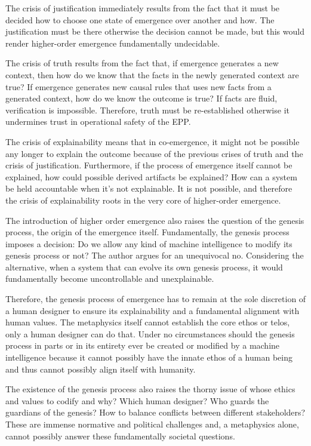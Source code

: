 The crisis of justification immediately results from the fact that it must be decided how to choose one state of emergence over another and how. The justification must be there otherwise the decision cannot be made, but this would render higher-order emergence fundamentally undecidable. 

The crisis of truth results from the fact that, if emergence generates a new context, then how do we know that
the facts in the newly generated context are true? If emergence generates new causal rules that uses new facts from a generated context, how do we know the outcome is true? If facts are fluid, verification is impossible. Therefore, truth must be re-established otherwise it undermines trust in operational safety of the EPP. 

The crisis of explainability means that in co-emergence, it might not be possible any longer to explain the outcome because of the previous crises of truth and the crisis of justification. Furthermore, if the process of emergence itself cannot be explained, how could possible derived artifacts be explained? How can a system be held accountable when it's not explainable. It is not possible, and therefore the crisis of explainability roots in the very core of higher-order emergence.

The introduction of higher order emergence also raises the question of the genesis process, 
the origin of the emergence itself. Fundamentally, the genesis process imposes a decision: Do we allow any kind of machine intelligence to modify its genesis process or not? The author argues for an unequivocal no. 
Considering the alternative, when a system that can evolve its own genesis process, it would fundamentally become uncontrollable and unexplainable. 

Therefore, the genesis process of emergence  has to remain at the sole discretion of a human designer to ensure its explainability and a fundamental alignment with human values. The metaphysics itself cannot establish the core ethos or telos, only a human designer can do that. Under no circumstances should the genesis process in parts or in its entirety ever be created or modified by a machine intelligence because it cannot possibly have the innate ethos of a human being and thus cannot possibly align itself with humanity. 

The existence of the genesis process also raises the thorny issue of whose ethics and values to codify and why? Which human designer? Who guards the guardians of the genesis? How to balance conflicts between different stakeholders? These are  immense normative and political challenges and, a metaphysics alone, cannot possibly answer these fundamentally societal questions. 

